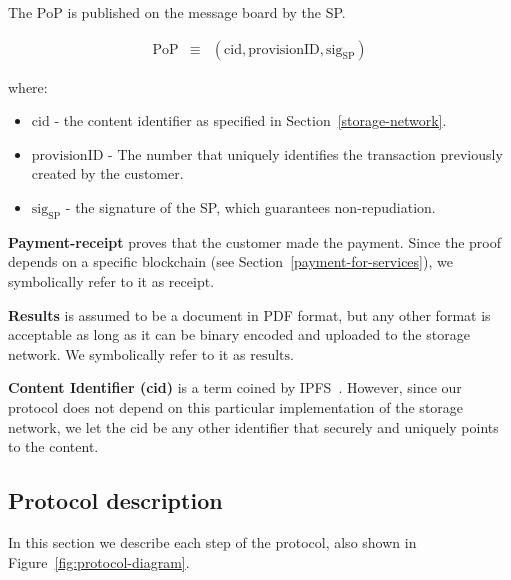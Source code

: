 \documentclass[pdftex,twocolumn,epjc3]{svjour3}
\begin{document}
{The $\mathrm{PoP}$ is published on the message board by the SP.


\begin{eqnarray}
\mathrm{PoP} & \equiv & (\mathrm{cid}, \mathrm{provisionID}, \mathrm{sig}_\mathrm{SP})
\end{eqnarray}

where:

\begin{itemize}

\item $\mathrm{cid}$ - the content identifier as specified in Section~\ref{storage-network}.
\item $\mathrm{provisionID}$ - The number that uniquely identifies the transaction previously created by the customer.
\item $\mathrm{sig}_\mathrm{SP}$ - the signature of the SP, which guarantees non-repudiation.
\end{itemize}

\noindent \textbf
{Payment-receipt}\label{payment-receipt} proves that the customer made the payment. Since the proof depends on a specific blockchain (see Section~\ref{payment-for-services}), we symbolically refer to it as $\mathrm{receipt}$.

\noindent \textbf
{Results}\label{results} is assumed to be a document in PDF format, but any other format is acceptable as long as it can be binary encoded and uploaded to the storage network. We symbolically refer to it as $\mathrm{results}$.

\noindent \textbf
{Content Identifier (cid)}\label{content-identifier-cid} is a term coined by IPFS~\cite{ipfsContentIdentifiersCIDs}. However, since our protocol does not depend on this particular implementation of the storage network, we let the $\mathrm{cid}$ be any other identifier that securely and uniquely points to the content.

\subsection{Protocol description}\label{protocol-description}

In this section we describe each step of the protocol, also shown in Figure~\ref{fig:protocol-diagram}.

}
\end{document}
